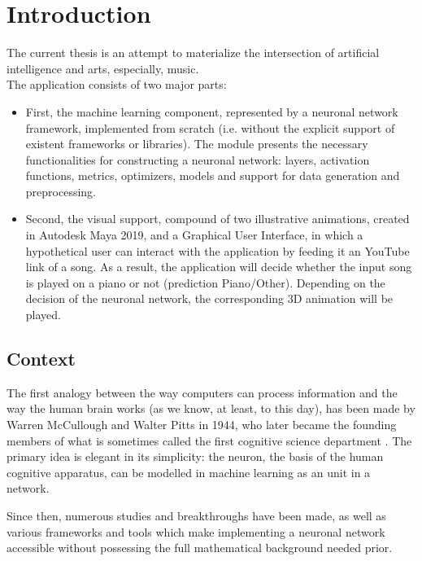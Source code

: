 \chapter*{Introduction}

The current thesis is an attempt to materialize the intersection of artificial intelligence and arts, especially, music. \\

The application consists of two major parts:\\
	\begin{itemize}
	\addtolength{\itemindent}{1cm}
		\item  First, the machine learning component, represented by a neuronal network framework, implemented from scratch (i.e. without the explicit support of existent frameworks or libraries). The module presents the necessary functionalities for constructing a neuronal network: layers, activation functions, metrics, optimizers, models and support for data generation and preprocessing.\\

		\item Second, the visual support, compound of two illustrative animations, created in Autodesk Maya 2019, and a Graphical User Interface, in which a hypothetical user can interact with the application by feeding it an YouTube link of a song. As a result, the application will decide whether the input song is played on a piano or not (prediction Piano/Other). Depending on the decision of the neuronal network, the corresponding 3D animation will be played.\\
	\end{itemize}

	\section{Context}

	The first analogy between the way computers can process information and the way the human brain works (as we know, at least, to this day), has been made by Warren McCullough and Walter Pitts in 1944, who later became the founding members of what is sometimes called the first cognitive science department \cite{mitnn}. The primary idea is elegant in its simplicity: the neuron, the basis of the human cognitive apparatus, can be modelled in machine learning as an unit in a network.

	Since then, numerous studies and breakthroughs have been made, as well as various frameworks and tools which make implementing a neuronal network accessible without possessing the full mathematical background needed prior.

